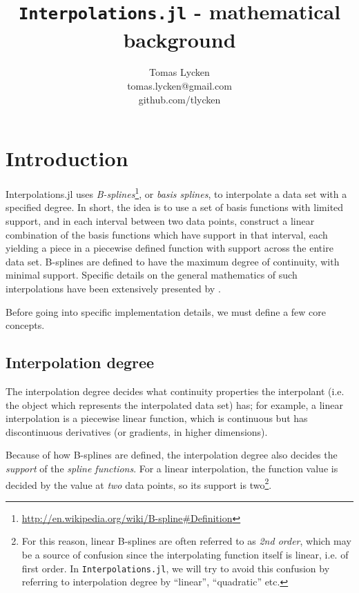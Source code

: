 \documentclass{article}
\author{Tomas Lycken\\tomas.lycken@gmail.com\\github.com/tlycken}
\title{\texttt{Interpolations.jl} - mathematical background}
\begin{document}
\maketitle
{}

\newpage
\tableofcontents
\newpage

\section{Introduction}
Interpolations.jl uses \emph{B-splines}\footnote{\url{http://en.wikipedia.org/wiki/B-spline\#Definition}}, or \emph{basis splines}, to interpolate a data set with a specified degree. In short, the idea is to use a set of basis functions with limited support, and in each interval between two data points, construct a linear combination of the basis functions which have support in that interval, each yielding a piece in a piecewise defined function with support across the entire data set. B-splines are defined to have the maximum degree of continuity, with minimal support. Specific details on the general mathematics of such interpolations have been extensively presented by \citet{875199}.

Before going into specific implementation details, we must define a few core concepts.

\subsection{Interpolation degree}

The interpolation degree decides what continuity properties the interpolant (i.e. the object which represents the interpolated data set) has; for example, a linear interpolation is a piecewise linear function, which is continuous but has discontinuous derivatives (or gradients, in higher dimensions).

Because of how B-splines are defined, the interpolation degree also decides the \emph{support} of the \emph{spline functions}. For a linear interpolation, the function value is decided by the value at \emph{two} data points, so its support is two\footnote{For this reason, linear B-splines are often referred to as \emph{2nd order}, which may be a source of confusion since the interpolating function itself is linear, i.e. of first order. In \texttt{Interpolations.jl}, we will try to avoid this confusion by referring to interpolation degree by ``linear'', ``quadratic'' etc.}.
\end{document}
